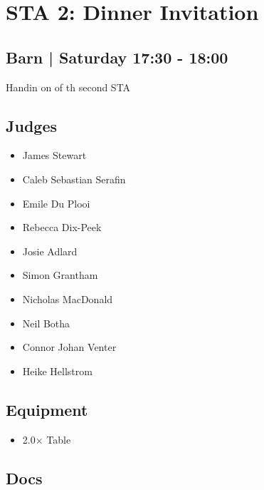 \documentclass[10pt]{article}
\begin{document}
		\begin{minipage}{\linewidth}
		\setcounter{section}{19}
	\section{STA 2: Dinner Invitation }
	\subsection*{Barn | Saturday 17:30 - 18:00}

	Handin on of th second STA

	\begin{multicols}{2}
	\subsection*{\faUsers \: Judges}
	\begin{itemize}
			\item James Stewart
			\item Caleb Sebastian Serafin
			\item Emile Du Plooi
			\item Rebecca Dix-Peek
			\item Josie Adlard
			\item Simon Grantham
			\item Nicholas MacDonald
			\item Neil Botha
			\item Connor Johan Venter
			\item Heike Hellstrom
		\end{itemize}
	\columnbreak
	\subsection*{\faWrench \: Equipment}
	
        \begin{itemize}
                    \item 2.0$\times$ \: Table
                \end{itemize}
                \vfill\null
        \subsection*{\faFile \: Docs}
     	\end{multicols}


	\vspace{1cm}
	\end{minipage}
\end{document}
